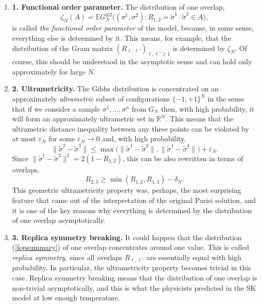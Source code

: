 \documentclass[12pt]{article}
\newcommand{\eps}{{\varepsilon}}
\newcommand{\e}{\mathbb{E}}
\newcommand{\Reals}{\mathbb{R}}
\theoremstyle{nonumberplain}
\begin{document}
\begin{enumerate}
\item[] \textbf{1. Functional order parameter.} The distribution of one overlap,
\begin{equation}
\zeta_N(A) = \e G_N^{\otimes 2}\bigl((\sigma^1,\sigma^2) : R_{1,2} = \tilde{\sigma}^1\cdot \tilde{\sigma}^2 \in A\bigr),
\label{fopsummary}
\end{equation}
is called \emph{the functional order parameter} of the model, because, in some sense, everything else is determined by it. This means, for example, that the distribution of the Gram matrix $(R_{\ell,\ell'})_{\ell,\ell'\geq 1}$  is determined by $\zeta_N$. Of course, this should be understood in the asymptotic sense and can hold only approximately for large $N$.

\item[]\textbf{2. Ultrametricity.} The Gibbs distribution is concentrated on an approximately \emph{ultrametric} subset of configurations $\{-1,+1\}^N$ in the sense that if we consider a sample $\sigma^1,\ldots,\sigma^n$ from $G_N$ then, with high probability, it will form an approximately ultrametric set in $\Reals^N$. This means that the ultrametric distance inequality between any three points can be violated by at most $\eps_N$ for some $\eps_N \to 0$ and, with high probability,
$$
\|\tilde{\sigma}^2-\tilde{\sigma}^3\| \leq \max\bigl(\|\tilde{\sigma}^1-\tilde{\sigma}^2\|, \|\tilde{\sigma}^1-\tilde{\sigma}^3\|\bigr) +\eps_N.
$$
Since $\|\tilde{\sigma}^1-\tilde{\sigma}^2\|^2 = 2(1-R_{1,2})$, this can be also rewritten in terms of overlaps,
$$
R_{2,3} \geq \min(R_{1,2},R_{1,3}) - \delta_N.
$$
This geometric ultrametricity property was, perhaps, the most surprising feature that came out of the interpretation of the original Parisi solution, and it is one of the key reasons why everything is determined by the distribution of one overlap asymptotically.

\item[]\textbf{3. Replica symmetry breaking.} It could happen that the distribution (\ref{fopsummary}) of one overlap concentrates around one value. This is called \emph{replica symmetry}, since all overlaps $R_{\ell,\ell'}$ are essentially equal with high probability. In particular, the ultrametricity property becomes trivial in this case. Replica symmetry breaking means that the distribution of one overlap is non-trivial asymptotically, and this is what the physicists predicted in the SK model at low enough temperature.
\end{enumerate}
\end{document}
